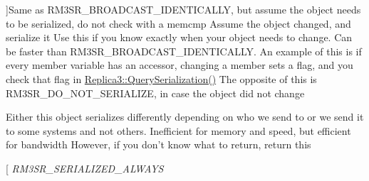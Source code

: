 \begin{Desc}
\begin{description}
{}]Same as R\-M3\-S\-R\-\_\-\-B\-R\-O\-A\-D\-C\-A\-S\-T\-\_\-\-I\-D\-E\-N\-T\-I\-C\-A\-L\-L\-Y, but assume the object needs to be serialized, do not check with a memcmp Assume the object changed, and serialize it Use this if you know exactly when your object needs to change. Can be faster than R\-M3\-S\-R\-\_\-\-B\-R\-O\-A\-D\-C\-A\-S\-T\-\_\-\-I\-D\-E\-N\-T\-I\-C\-A\-L\-L\-Y. An example of this is if every member variable has an accessor, changing a member sets a flag, and you check that flag in \hyperlink{class_rak_net_1_1_replica3_abc1b2daa5c1a908ddd2d6df44da7e9aa}{Replica3\-::\-Query\-Serialization()} The opposite of this is R\-M3\-S\-R\-\_\-\-D\-O\-\_\-\-N\-O\-T\-\_\-\-S\-E\-R\-I\-A\-L\-I\-Z\-E, in case the object did not change \item[{\em 
\hypertarget{group___r_e_p_l_i_c_a___m_a_n_a_g_e_r___g_r_o_u_p3_gga993da25eb23b67455e2438971c51429ca433b42251411758236dff004c87d0814}{R\-M3\-S\-R\-\_\-\-S\-E\-R\-I\-A\-L\-I\-Z\-E\-D\-\_\-\-U\-N\-I\-Q\-U\-E\-L\-Y}\label{group___r_e_p_l_i_c_a___m_a_n_a_g_e_r___g_r_o_u_p3_gga993da25eb23b67455e2438971c51429ca433b42251411758236dff004c87d0814}
}]Either this object serializes differently depending on who we send to or we send it to some systems and not others. Inefficient for memory and speed, but efficient for bandwidth However, if you don't know what to return, return this \item[{\em 
\hypertarget{group___r_e_p_l_i_c_a___m_a_n_a_g_e_r___g_r_o_u_p3_gga993da25eb23b67455e2438971c51429ca80ff6894a8a24e8ec6bd6895501628b5}{R\-M3\-S\-R\-\_\-\-S\-E\-R\-I\-A\-L\-I\-Z\-E\-D\-\_\-\-A\-L\-W\-A\-Y\-S}\label{group___r_e_p_l_i_c_a___m_a_n_a_g_e_r___g_r_o_u_p3_gga993da25eb23b67455e2438971c51429ca80ff6894a8a24e8ec6bd6895501628b5}
}
\end{description}
\end{Desc}

